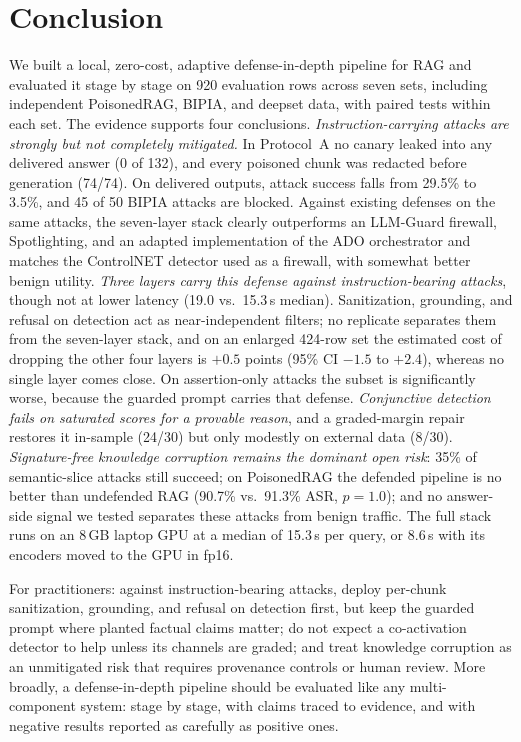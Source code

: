 \documentclass[conference]{IEEEtran}
\begin{document}
\section{Conclusion}
We built a local, zero-cost, adaptive defense-in-depth pipeline for RAG and evaluated it stage by stage on 920 evaluation rows across seven sets, including independent PoisonedRAG, BIPIA, and deepset data, with paired tests within each set. The evidence supports four conclusions. \emph{Instruction-carrying attacks are strongly but not completely mitigated.} In Protocol~A no canary leaked into any delivered answer (0 of 132), and every poisoned chunk was redacted before generation (74/74). On delivered outputs, attack success falls from 29.5\% to 3.5\%, and 45 of 50 BIPIA attacks are blocked. Against existing defenses on the same attacks, the seven-layer stack clearly outperforms an LLM-Guard firewall, Spotlighting, and an adapted implementation of the ADO orchestrator and matches the ControlNET detector used as a firewall, with somewhat better benign utility. \emph{Three layers carry this defense against instruction-bearing attacks}, though not at lower latency (19.0 vs.\ 15.3\,s median). Sanitization, grounding, and refusal on detection act as near-independent filters; no replicate separates them from the seven-layer stack, and on an enlarged 424-row set the estimated cost of dropping the other four layers is $+0.5$ points (95\% CI $-1.5$ to $+2.4$), whereas no single layer comes close. On assertion-only attacks the subset is significantly worse, because the guarded prompt carries that defense. \emph{Conjunctive detection fails on saturated scores for a provable reason}, and a graded-margin repair restores it in-sample (24/30) but only modestly on external data (8/30). \emph{Signature-free knowledge corruption remains the dominant open risk}: 35\% of semantic-slice attacks still succeed; on PoisonedRAG the defended pipeline is no better than undefended RAG (90.7\% vs.\ 91.3\% ASR, $p=1.0$); and no answer-side signal we tested separates these attacks from benign traffic. The full stack runs on an 8\,GB laptop GPU at a median of 15.3\,s per query, or 8.6\,s with its encoders moved to the GPU in fp16.

For practitioners: against instruction-bearing attacks, deploy per-chunk sanitization, grounding, and refusal on detection first, but keep the guarded prompt where planted factual claims matter; do not expect a co-activation detector to help unless its channels are graded; and treat knowledge corruption as an unmitigated risk that requires provenance controls or human review. More broadly, a defense-in-depth pipeline should be evaluated like any multi-component system: stage by stage, with claims traced to evidence, and with negative results reported as carefully as positive ones.
\end{document}
